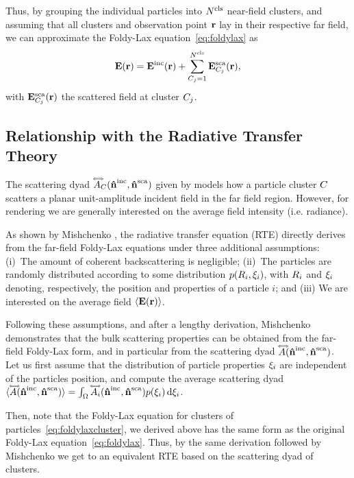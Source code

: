 Thus, by grouping the individual particles into ${N^\text{cls}}$ near-field clusters, and assuming that all clusters and observation point $\mathbf{r}$ lay in their respective far field, we can approximate the Foldy-Lax equation~\eqref{eq:foldylax} as
\begin{equation}
    \mathbf{E}(\mathbf{r}) = \mathbf{E}^\text{inc}(\mathbf{r}) + \sum_{C_j=1}^{{N^\text{cls}}} \mathbf{E}^\text{sca}_{C_j}(\mathbf{r}),
    \label{eq:foldylaxcluster}
\end{equation}
with $\mathbf{E}^\text{sca}_{C_j}(\mathbf{r})$ the scattered field at cluster $C_j$. 


\subsection{Relationship with the Radiative Transfer Theory}
\label{ssec:ours_RTT}

The scattering dyad $\accentset{\Longleftrightarrow}{A}_C(\mathbf{\hat{n}}^{\text{inc}},\mathbf{\hat{n}}^{\text{sca}})$ given by  models how a particle cluster $C$ scatters a planar unit-amplitude incident field in the far field region. However, for rendering we are generally interested on the average field intensity (i.e. radiance). 

As shown by Mishchenko \cite{mishchenko2002vector}, the radiative transfer equation (RTE) directly derives from the far-field Foldy-Lax equations under three additional assumptions: (i)~The amount of coherent backscattering is negligible; (ii)~The particles are randomly distributed according to some distribution $p(R_i,\xi_i)$, with $R_i$ and $\xi_i$ denoting, respectively, the position and properties of a particle $i$; and (iii) We are interested on the average field ${\langle \mathbf{E}(\mathbf{r}) \rangle}$. 

Following these assumptions, and after a lengthy derivation, Mishchenko demonstrates that the bulk scattering properties can be obtained from the far-field Foldy-Lax form, and in particular from the scattering dyad $\accentset{\Longleftrightarrow}{A}(\mathbf{\hat{n}}^{\text{inc}},\mathbf{\hat{n}}^{\text{sca}})$. Let us first assume that the distribution of particle properties $\xi_i$ are independent of the particles position, and compute the average scattering dyad ${\langle \accentset{\Longleftrightarrow}{A}(\mathbf{\hat{n}}^{\text{inc}},\mathbf{\hat{n}}^{\text{sca}}) \rangle} = \int_\Omega \accentset{\Longleftrightarrow}{A}_i(\mathbf{\hat{n}}^{\text{inc}},\mathbf{\hat{n}}^{\text{sca}}) p(\xi_i) \,\text{d}\xi_i$. 

Then, note that the Foldy-Lax equation for clusters of particles~\eqref{eq:foldylaxcluster}, we derived above has the same form as the original Foldy-Lax equation~\eqref{eq:foldylax}. Thus, by the same derivation followed by Mishchenko we get to an equivalent RTE based on the scattering dyad of clusters. 

